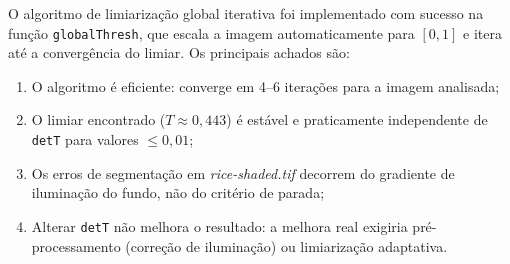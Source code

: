 \documentclass[12pt,a4paper,oneside,brazil,chapter=TITLE,section=TITLE]{abntex2}
\begin{document}
O algoritmo de limiariza\c{c}\~ao global iterativa foi implementado
com sucesso na fun\c{c}\~ao \texttt{globalThresh}, que escala a imagem
automaticamente para $[0,1]$ e itera at\'e a converg\^encia do limiar.
Os principais achados s\~ao:

\begin{enumerate}
  \item O algoritmo \'e eficiente: converge em 4--6 itera\c{c}\~oes
        para a imagem analisada;
  \item O limiar encontrado ($T \approx 0{,}443$) \'e est\'avel e
        praticamente independente de \texttt{detT} para valores
        $\leq 0{,}01$;
  \item Os erros de segmenta\c{c}\~ao em \textit{rice-shaded.tif}
        decorrem do gradiente de ilumina\c{c}\~ao do fundo, n\~ao do
        crit\'erio de parada;
  \item Alterar \texttt{detT} n\~ao melhora o resultado: a melhora
        real exigiria pr\'e-processamento (corre\c{c}\~ao de
        ilumina\c{c}\~ao) ou limiariza\c{c}\~ao adaptativa.
\end{enumerate}

\postextual

\end{document}
